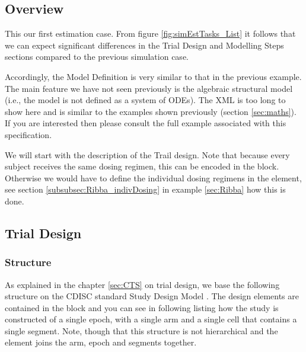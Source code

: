 \subsection{Overview}

This our first estimation case. From figure \ref{fig:simEstTasks_List} 
it follows that we can expect significant differences in the Trial Design and Modelling Steps
sections compared to the previous simulation case.


Accordingly, the Model Definition is very similar to that in the
previous example.  The main \pharmml feature we have not seen
previously is the algebraic structural model (i.e., the model is not
defined as a system of ODEs). The XML is too long to show here and is
similar to the examples shown previously (section \ref{sec:maths}). If
you are interested then please consult the full example associated
with this specification.

We will start with the description of the Trail design. Note that because
every subject receives the same dosing regimen, this can be encoded 
in the  block. Otherwise we would have to define the 
individual dosing regimens in the  element, see
section \ref{subsubsec:Ribba_indivDosing} in example \ref{sec:Ribba} how
this is done.



\subsection{Trial Design}
\label{eg4_subsec:trialDesign}
\subsubsection{Structure}

As explained in the chapter \ref{sec:CTS} on trial design, we base the following 
structure on the CDISC standard Study Design Model \cite{CDISC:2011a}. 
The design elements are contained in the  block and you can see 
in following listing 
how the study is constructed of a single epoch, 
with a single arm and a single cell that contains a single segment. Note, though 
that this structure is not hierarchical and the  element joins the arm, 
epoch and segments together. 

